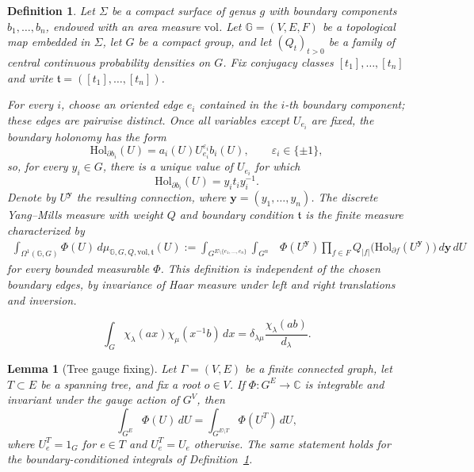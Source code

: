 \documentclass[10pt,a4paper]{amsart}
\newtheorem{definition}{Definition}
\newtheorem{lemma}{Lemma}
\newcommand\Gbb{{\mathbb{G}}}
\newcommand\Hol{{\mathrm{Hol}}}
\newcommand\vol{\mathrm{vol}}
\begin{document}
\begin{definition}\label{def:discrete-YM-measure}
Let $\Sigma$ be a compact surface of genus $g$ with boundary components
$b_1,\ldots,b_n$, endowed with an area measure $\vol$. Let
$\Gbb=(V,E,F)$ be a topological map embedded in $\Sigma$, let $G$ be a
compact group, and let $(Q_t)_{t>0}$ be a family of central continuous
probability densities on $G$. Fix conjugacy classes
$[t_1],\ldots,[t_n]$ and write
$\mathfrak t=([t_1],\ldots,[t_n])$.

For every $i$, choose an oriented edge $e_i$ contained in the $i$-th
boundary component; these edges are pairwise distinct. Once all variables
except $U_{e_i}$ are fixed, the boundary holonomy has the form
\[
 \Hol_{\partial b_i}(U)=a_i(U)U_{e_i}^{\varepsilon_i}b_i(U),
 \qquad \varepsilon_i\in\{\pm1\},
\]
so, for every $y_i\in G$, there is a unique value of $U_{e_i}$ for which
\[
 \Hol_{\partial b_i}(U)=y_it_iy_i^{-1}.
\]
Denote by $U^{\mathbf y}$ the resulting connection, where
$\mathbf y=(y_1,\ldots,y_n)$. The \emph{discrete Yang--Mills measure}
with weight $Q$ and boundary condition $\mathfrak t$ is the finite measure
characterized by
\begin{equation}\label{eq:DS-rigorous}
\begin{aligned}
 \int_{\Omega^1(\Gbb,G)}\! \Phi(U)\,
 d\mu_{\Gbb,G,Q,\vol,\mathfrak t}(U)
 :=
 \int_{G^{E\setminus\{e_1,\ldots,e_n\}}}\int_{G^n}
 &\Phi(U^{\mathbf y})
 \prod_{f\in F}Q_{|f|}\bigl(\Hol_{\partial f}(U^{\mathbf y})\bigr)
 \,d\mathbf y\,dU
\end{aligned}
\end{equation}
for every bounded measurable $\Phi$. This definition is independent of the
chosen boundary edges, by invariance of Haar measure under left and right
translations and inversion.
\end{definition}

\begin{equation}\label{eq:character-face-gluing}
 \int_G\chi_\lambda(ax)\chi_\mu(x^{-1}b)\,dx
 =
 \delta_{\lambda\mu}\frac{\chi_\lambda(ab)}{d_\lambda}.
\end{equation}

\begin{lemma}[Tree gauge fixing]\label{lem:tree-gauge-fixing}
Let $\Gamma=(V,E)$ be a finite connected graph, let $T\subset E$ be a
spanning tree, and fix a root $o\in V$. If $\Phi:G^E\to\mathbb C$ is
integrable and invariant under the gauge action of $G^V$, then
\[
 \int_{G^E}\Phi(U)\,dU
 =
 \int_{G^{E\setminus T}}\Phi(U^T)\,dU,
\]
where $U^T_e=1_G$ for $e\in T$ and $U^T_e=U_e$ otherwise.
The same statement holds for the boundary-conditioned integrals of
Definition~\ref{def:discrete-YM-measure}.
\end{lemma}
\end{document}
